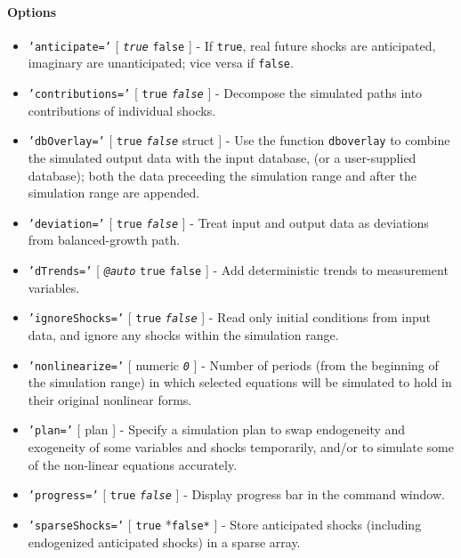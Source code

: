 \paragraph{Options}

\begin{itemize}
\item
  \texttt{'anticipate='} {[} \emph{\texttt{true}} \textbar{}
  \texttt{false} {]} - If \texttt{true}, real future shocks are
  anticipated, imaginary are unanticipated; vice versa if
  \texttt{false}.
\item
  \texttt{'contributions='} {[} \texttt{true} \textbar{}
  \emph{\texttt{false}} {]} - Decompose the simulated paths into
  contributions of individual shocks.
\item
  \texttt{'dbOverlay='} {[} \texttt{true} \textbar{}
  \emph{\texttt{false}} \textbar{} struct {]} - Use the function
  \texttt{dboverlay} to combine the simulated output data with the input
  database, (or a user-supplied database); both the data preceeding the
  simulation range and after the simulation range are appended.
\item
  \texttt{'deviation='} {[} \texttt{true} \textbar{}
  \emph{\texttt{false}} {]} - Treat input and output data as deviations
  from balanced-growth path.
\item
  \texttt{'dTrends='} {[} \emph{\texttt{@auto}} \textbar{} \texttt{true}
  \textbar{} \texttt{false} {]} - Add deterministic trends to
  measurement variables.
\item
  \texttt{'ignoreShocks='} {[} \texttt{true} \textbar{}
  \emph{\texttt{false}} {]} - Read only initial conditions from input
  data, and ignore any shocks within the simulation range.
\item
  \texttt{'nonlinearize='} {[} numeric \textbar{} \emph{\texttt{0}} {]}
  - Number of periods (from the beginning of the simulation range) in
  which selected equations will be simulated to hold in their original
  nonlinear forms.
\item
  \texttt{'plan='} {[} plan {]} - Specify a simulation plan to swap
  endogeneity and exogeneity of some variables and shocks temporarily,
  and/or to simulate some of the non-linear equations accurately.
\item
  \texttt{'progress='} {[} \texttt{true} \textbar{}
  \emph{\texttt{false}} {]} - Display progress bar in the command
  window.
\item
  \texttt{'sparseShocks='} {[} \texttt{true} \textbar{} *\texttt{false*}
  {]} - Store anticipated shocks (including endogenized anticipated
  shocks) in a sparse array.
\end{itemize}

